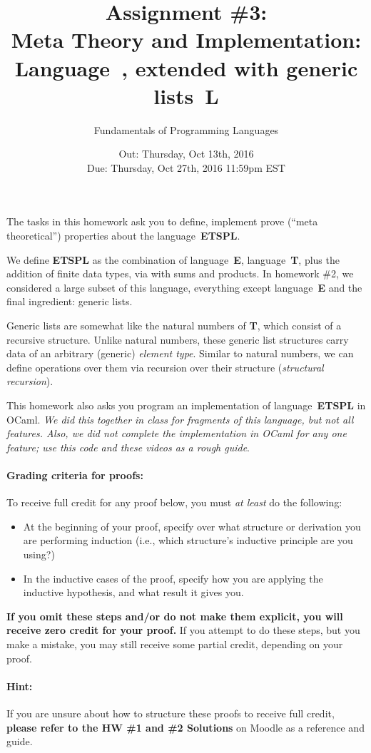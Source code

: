 \documentclass[11pt]{article}
\title{Assignment \#3: \\
  Meta Theory and Implementation:
  \\Language~\ETSP, extended with generic lists~\textbf{\textsf{L}}}
\author{Fundamentals of Programming Languages}
\date{Out: Thursday, Oct 13th, 2016\\
      Due: Thursday, Oct 27th, 2016 11:59pm EST}
\newcommand{\E}{\textbf{\textsf{E}}\xspace}
\newcommand{\T}{\textbf{\textsf{T}}\xspace}
\newcommand{\ETSPL}{\textbf{\textsf{ETSPL}}\xspace}
\begin{document}
\maketitle

The tasks in this homework ask you to define, implement prove (``meta theoretical'')
properties about the language~\ETSPL.

We define \ETSPL as the combination of language~\E, language~\T, plus
the addition of finite data types, via with sums and products.  In
homework \#2, we considered a large subset of this language,
everything except language~\E and the final ingredient: generic lists.

Generic lists are somewhat like the natural numbers of \T, which
consist of a recursive structure.
%
Unlike natural numbers, these generic list structures carry data of an
arbitrary (generic) \emph{element type}.
%
Similar to natural numbers, we can define operations over them via
recursion over their structure (\emph{structural recursion}).

This homework also asks you program an implementation of
language~\ETSPL in OCaml.
%
\emph{We did this together in class for fragments of this language,
  but not all features.  Also, we did not complete the implementation
  in OCaml for any one feature; use this code and these videos as a
  rough guide}.

\paragraph{Grading criteria for proofs:} 
To receive full credit for any proof below, you must \emph{at least} do the following:
\begin{itemize}
\item At the beginning of your proof, specify over what structure or
  derivation you are performing induction (i.e., which structure's
  inductive principle are you using?)
\item In the inductive cases of the proof, specify how you are applying the inductive hypothesis, and what result it gives you.
\end{itemize}
\textbf{If you omit these steps and/or do not make them explicit, you
  will receive zero credit for your proof.}  If you attempt to do
these steps, but you make a mistake, you may still receive some partial credit, depending on your proof.

\paragraph{Hint:}
If you are unsure about how to structure these proofs to receive full credit, 
\textbf{please refer to the HW \#1 and \#2 Solutions} on Moodle as a reference and guide.
\end{document}
